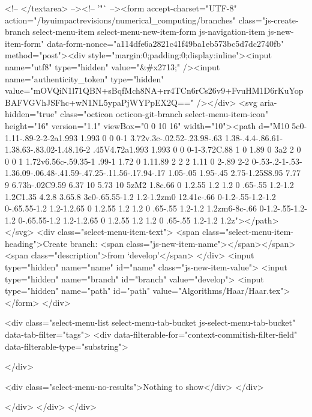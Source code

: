           <!-- </textarea> --><!-- '"` --><form accept-charset="UTF-8" action="/byuimpactrevisions/numerical_computing/branches" class="js-create-branch select-menu-item select-menu-new-item-form js-navigation-item js-new-item-form" data-form-nonce="a114dfe6a2821c41f49ba1eb573bc5d7dc2740fb" method="post"><div style="margin:0;padding:0;display:inline"><input name="utf8" type="hidden" value="&#x2713;" /><input name="authenticity_token" type="hidden" value="mOVQiN1l71QBN+sBqfMch8NA+rr4TCn6rCs26v9+FvuHM1D6rKuYopBAFVGVhJSFhc+wN1NL5ypaPjWYPpEX2Q==" /></div>
          <svg aria-hidden="true" class="octicon octicon-git-branch select-menu-item-icon" height="16" version="1.1" viewBox="0 0 10 16" width="10"><path d="M10 5c0-1.11-.89-2-2-2a1.993 1.993 0 0 0-1 3.72v.3c-.02.52-.23.98-.63 1.38-.4.4-.86.61-1.38.63-.83.02-1.48.16-2 .45V4.72a1.993 1.993 0 0 0-1-3.72C.88 1 0 1.89 0 3a2 2 0 0 0 1 1.72v6.56c-.59.35-1 .99-1 1.72 0 1.11.89 2 2 2 1.11 0 2-.89 2-2 0-.53-.2-1-.53-1.36.09-.06.48-.41.59-.47.25-.11.56-.17.94-.17 1.05-.05 1.95-.45 2.75-1.25S8.95 7.77 9 6.73h-.02C9.59 6.37 10 5.73 10 5zM2 1.8c.66 0 1.2.55 1.2 1.2 0 .65-.55 1.2-1.2 1.2C1.35 4.2.8 3.65.8 3c0-.65.55-1.2 1.2-1.2zm0 12.41c-.66 0-1.2-.55-1.2-1.2 0-.65.55-1.2 1.2-1.2.65 0 1.2.55 1.2 1.2 0 .65-.55 1.2-1.2 1.2zm6-8c-.66 0-1.2-.55-1.2-1.2 0-.65.55-1.2 1.2-1.2.65 0 1.2.55 1.2 1.2 0 .65-.55 1.2-1.2 1.2z"></path></svg>
            <div class="select-menu-item-text">
              <span class="select-menu-item-heading">Create branch: <span class="js-new-item-name"></span></span>
              <span class="description">from ‘develop’</span>
            </div>
            <input type="hidden" name="name" id="name" class="js-new-item-value">
            <input type="hidden" name="branch" id="branch" value="develop">
            <input type="hidden" name="path" id="path" value="Algorithms/Haar/Haar.tex">
</form>
      </div>

      <div class="select-menu-list select-menu-tab-bucket js-select-menu-tab-bucket" data-tab-filter="tags">
        <div data-filterable-for="context-commitish-filter-field" data-filterable-type="substring">


        </div>

        <div class="select-menu-no-results">Nothing to show</div>
      </div>

    </div>
  </div>
</div>

